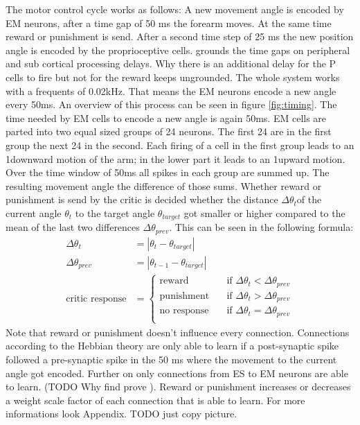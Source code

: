 The motor control cycle works as follows: A new movement angle is encoded by EM neurons, after a time gap of 50 ms the forearm moves. At the same time reward or punishment is send. After a second time step of 25 ms the new position angle is encoded by the proprioceptive cells. \cite{sebastianPaper} grounds the time gaps on peripheral and sub cortical processing delays. Why there is an additional delay for the P cells to fire but not for the reward keeps ungrounded. The whole system works with a frequents of 0.02kHz. That means the EM neurons encode a new angle every 50ms. An overview of this process can be seen in figure \ref{fig:timing}.
The time needed by EM cells to encode a new angle is again 50ms. EM cells are parted into two equal sized groups of 24 neurons. The first 24 are in the first group the next 24 in the second. Each firing of a cell in the first group leads to an 1\degree  downward motion of the arm; in the lower part it leads to an 1\degree  upward motion. Over the time window of 50ms all spikes in each group are summed up. The resulting movement angle the difference of those sums.
Whether reward or punishment is send by the critic is decided whether the distance $\Delta\theta_t $of the current angle $\theta_t$  to the target angle $\theta_{target}$ got smaller or higher compared to the mean of the last two differences $\Delta\theta_{prev}$. This can be seen in the following formula:
\begin{align*}
	\Delta\theta_t &= |\theta_t-\theta_{target}|\\
	\Delta\theta_{prev} &= \left| \theta_{t-1} -\theta_{target}  \right |\\
	\text{critic response} &= 
	\begin{cases}
	\text{reward} &  \quad \text{if } \Delta\theta_t < \Delta\theta_{prev}\\
	\text{punishment}& \quad \text{if } \Delta\theta_t > \Delta\theta_{prev}\\
	\text{no response}& \quad \text{if } \Delta\theta_t = \Delta\theta_{prev}\\
	\end{cases}
\end{align*}
Note that reward or punishment doesn't influence every connection. Connections according to the Hebbian theory \cite{originalHebbianLaw} are only able to learn if a post-synaptic spike followed a pre-synaptic spike in the 50 ms where the movement to the current angle got encoded. Further on only connections from ES to EM neurons are able to learn. (TODO Why find prove ).  Reward or punishment increases or decreases a weight scale factor of each connection that is able to learn. For more informations look Appendix. TODO just copy picture.
